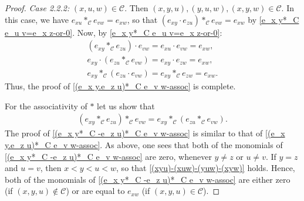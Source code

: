 \documentclass[10pt,a4paper]{amsart}
\newcommand{\C}{\mathcal{C}}
\begin{document}
\begin{proof}
		\textit{Case 2.2.2:} $(x,u,w)\in\C$. Then $(x,y,u),(y,u,w),(x,y,w)\in\C$. In this case, we have $e_{xu}*_\C e_{vw}=e_{xw}$, so that $(e_{xy}\cdot e_{zu})*_\C e_{vw}=e_{xw}$ by \eqref{e_x y*_C e_u v=e_x z-or-0}. Now,         by \eqref{e_x y*_C e_u v=e_x z-or-0}:
        \begin{gather*}
            (e_{xy}*_\C e_{zu})\cdot e_{vw}
            =e_{xu}\cdot e_{vw}
            =e_{xw}, \\
            e_{xy}\cdot (e_{zu}*_\C e_{vw})
            =e_{xy}\cdot e_{zw}
            =e_{xw}, \\
            e_{xy}*_\C (e_{zu}\cdot e_{vw})
            =e_{xy}*_\C e_{zw}
            =e_{xw}.
        \end{gather*}
		Thus, the proof of \eqref{(e_x y.e_z u)*_C e_v w-assoc} is complete.

		For the associativity of $*$ let us show that
		\begin{align}\label{(e_x y*_C -e_z u)*_C e_v w-assoc}
			(e_{xy}*_\C e_{zu})*_\C e_{vw}=e_{xy}*_\C (e_{zu}*_\C e_{vw}).
		\end{align}
		The proof of \eqref{(e_x y*_C -e_z u)*_C e_v w-assoc} is similar to that of \eqref{(e_x y.e_z u)*_C e_v w-assoc}. As above, one sees that both of the monomials of \eqref{(e_x y*_C -e_z u)*_C e_v w-assoc} are zero, whenever $y\ne z$ or $u\ne v$. If $y=z$ and $u=v$, then $x<y<u<w$, so that \eqref{(xyu)-(xuw)-(yuw)-(xyw)} holds. Hence, both of the monomials of \eqref{(e_x y*_C -e_z u)*_C e_v w-assoc} are either zero (if $(x,y,u)\not\in\C$) or are equal to $e_{xw}$ (if $(x,y,u)\in\C$).
	\end{proof}
\end{document}
